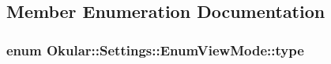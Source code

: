 \subsection{Member Enumeration Documentation}
\hypertarget{classOkular_1_1Settings_1_1EnumViewMode_a33bc89b0f0c02bd5539bad916569a665}{
\subsubsection[{type}]{\setlength{\rightskip}{0pt plus 5cm}enum {\bf Okular\+::\+Settings\+::\+Enum\+View\+Mode\+::type}}}\label{classOkular_1_1Settings_1_1EnumViewMode_a33bc89b0f0c02bd5539bad916569a665}
